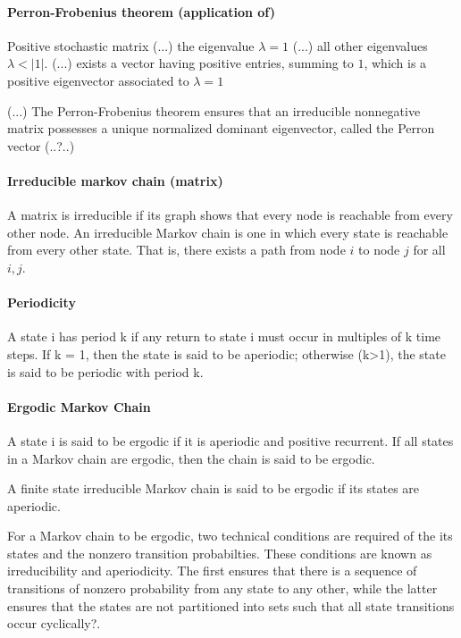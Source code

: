 \paragraph{Perron-Frobenius theorem (application of)} Positive stochastic matrix (...) the eigenvalue $\lambda = 1$  (...) all other eigenvalues $\lambda < |1|$. (...) exists a vector having positive entries, summing to $1$, which is a positive eigenvector associated to $\lambda = 1$

(...) The Perron-Frobenius theorem ensures that an irreducible nonnegative matrix possesses a unique normalized dominant eigenvector, called the Perron vector (..?..)



\paragraph{Irreducible markov chain (matrix)}  A matrix is irreducible if its graph shows that every node is reachable from every other node. An irreducible Markov chain is one in which every state is reachable from every other state. That is, there exists a path from node $i$ to node $j$ for all $i,j$.

\paragraph{Periodicity} A state i has period k if any return to state i must occur in multiples of k time steps. If k = 1, then the state is said to be aperiodic; otherwise (k>1), the state is said to be periodic with period k.

\paragraph{Ergodic Markov Chain} A state i is said to be ergodic if it is aperiodic and positive recurrent. If all states in a Markov chain are ergodic, then the chain is said to be ergodic.

A finite state irreducible Markov chain is said to be ergodic if its states are aperiodic.

For a Markov chain to be ergodic, two technical conditions are required of the its states and the nonzero transition probabilties. These conditions are known as irreducibility and aperiodicity. The first ensures that there is a sequence of transitions of nonzero probability from any state to any other, while the latter ensures that the states are not partitioned into sets such that all state transitions occur cyclically?.




